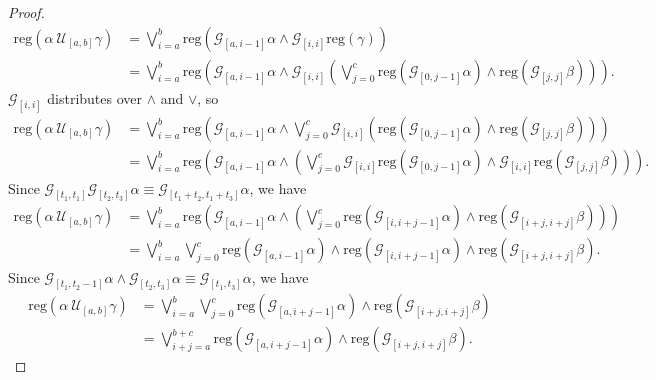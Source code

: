 \documentclass[runningheads]{llncs}
\begin{document}
\begin{proof}
\begin{align*}
\text{reg}\left(\alpha \ \mathcal{U}_{[a,b]}\gamma\right) &= \bigvee_{i=a}^{b} \text{reg}\left(\mathcal{G}_{[a,i-1]}\alpha \land \mathcal{G}_{[i, i]}\text{reg}\left(\gamma\right)\right)\\
&= \bigvee_{i=a}^{b} \text{reg}\left(\mathcal{G}_{[a,i-1]}\alpha \land  \mathcal{G}_{[i, i]}\left( \bigvee_{j=0}^{c} \text{reg}\left(\mathcal{G}_{[0,j-1]}\alpha\right) \land \text{reg}\left(\mathcal{G}_{[j, j]}\beta\right) \right) \right).
\end{align*}
$\mathcal{G}_{[i, i]}$ distributes over $\land$ and $\lor$, so
\begin{align*}
\text{reg}\left(\alpha \ \mathcal{U}_{[a,b]}\gamma\right) &= \bigvee_{i=a}^{b} \text{reg}\left(\mathcal{G}_{[a,i-1]}\alpha \land  \bigvee_{j=0}^{c} \mathcal{G}_{[i, i]}\left( \text{reg}\left(\mathcal{G}_{[0,j-1]}\alpha\right) \land \text{reg}\left(\mathcal{G}_{[j, j]}\beta\right) \right) \right) \\
&= \bigvee_{i=a}^{b} \text{reg}\left(\mathcal{G}_{[a,i-1]}\alpha \land \left( \bigvee_{j=0}^{c} \mathcal{G}_{[i, i]}\text{reg}\left(\mathcal{G}_{[0,j-1]}\alpha\right) \land \mathcal{G}_{[i, i]}\text{reg}\left(
\mathcal{G}_{[j, j]}\beta \right) \right) \right).
\end{align*}
Since $\mathcal{G}_{[t_1,t_1]} \mathcal{G}_{[t_2,t_3]} \alpha \equiv \mathcal{G}_{[t_1+t_2,t_1+t_3]} \alpha$, we have
\begin{align*}
\text{reg}\left(\alpha \ \mathcal{U}_{[a,b]}\gamma\right) &= \bigvee_{i=a}^{b} \text{reg}\left(\mathcal{G}_{[a,i-1]}\alpha \land \left( \bigvee_{j=0}^{c} \text{reg}\left(\mathcal{G}_{[i,i+j-1]}\alpha\right) \land \text{reg}\left(\mathcal{G}_{[i+j, i+j]}\beta \right) \right) \right) \\
&= \bigvee_{i=a}^{b}  \bigvee_{j=0}^{c} \text{reg}\left(\mathcal{G}_{[a,i-1]}\alpha\right) \land  \text{reg}\left(\mathcal{G}_{[i,i+j-1]}\alpha\right) \land \text{reg}\left(\mathcal{G}_{[i+j, i+j]}\beta \right).
\end{align*}
Since $\mathcal{G}_{[t_1,t_2-1]}\alpha \land \mathcal{G}_{[t_2,t_3]} \alpha \equiv \mathcal{G}_{[t_1,t_3]} \alpha$, we have
\begin{align*}
\text{reg}\left(\alpha \ \mathcal{U}_{[a,b]}\gamma\right) &= \bigvee_{i=a}^{b}  \bigvee_{j=0}^{c} \text{reg}\left(\mathcal{G}_{[a,i+j-1]}\alpha\right) \land \text{reg}\left(\mathcal{G}_{[i+j, i+j]}\beta  \right)\\
&= \bigvee_{i+j=a}^{b+c} \text{reg}\left(\mathcal{G}_{[a,i+j-1]}\alpha\right) \land \text{reg}\left(\mathcal{G}_{[i+j, i+j]}\beta  \right).

\end{align*}
\end{proof}
\end{document}

